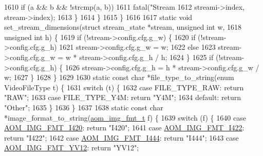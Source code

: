 \begin{DoxyCodeInclude}
{{{{{{{{{{{{{{{{{{{{{{{{1610       \textcolor{keywordflow}{if} (a && b && !strcmp(a, b))
1611         fatal(\textcolor{stringliteral}{"Stream %
1612               streami->index, stream->index);
1613     \}
1614   \}
1615 \}
1616 
1617 \textcolor{keyword}{static} \textcolor{keywordtype}{void} set\_stream\_dimensions(\textcolor{keyword}{struct} stream\_state *stream, \textcolor{keywordtype}{unsigned} \textcolor{keywordtype}{int} w,
1618                                   \textcolor{keywordtype}{unsigned} \textcolor{keywordtype}{int} h) \{
1619   \textcolor{keywordflow}{if} (!stream->config.cfg.g\_w) \{
1620     \textcolor{keywordflow}{if} (!stream->config.cfg.g\_h)
1621       stream->config.cfg.g\_w = w;
1622     \textcolor{keywordflow}{else}
1623       stream->config.cfg.g\_w = w * stream->config.cfg.g\_h / h;
1624   \}
1625   \textcolor{keywordflow}{if} (!stream->config.cfg.g\_h) \{
1626     stream->config.cfg.g\_h = h * stream->config.cfg.g\_w / w;
1627   \}
1628 \}
1629 
1630 \textcolor{keyword}{static} \textcolor{keyword}{const} \textcolor{keywordtype}{char} *file\_type\_to\_string(\textcolor{keyword}{enum} VideoFileType t) \{
1631   \textcolor{keywordflow}{switch} (t) \{
1632     \textcolor{keywordflow}{case} FILE\_TYPE\_RAW: \textcolor{keywordflow}{return} \textcolor{stringliteral}{"RAW"};
1633     \textcolor{keywordflow}{case} FILE\_TYPE\_Y4M: \textcolor{keywordflow}{return} \textcolor{stringliteral}{"Y4M"};
1634     \textcolor{keywordflow}{default}: \textcolor{keywordflow}{return} \textcolor{stringliteral}{"Other"};
1635   \}
1636 \}
1637 
1638 \textcolor{keyword}{static} \textcolor{keyword}{const} \textcolor{keywordtype}{char} *image\_format\_to\_string(\hyperlink{aom__image_8h_ab71efff8c7f49380fad23b93bc2e9bfc}{aom\_img\_fmt\_t} f) \{
1639   \textcolor{keywordflow}{switch} (f) \{
1640     \textcolor{keywordflow}{case} \hyperlink{aom__image_8h_a930317c04b4bd0a660bb5e744055523cabd778a3d697463e89d12a1117f417b60}{AOM\_IMG\_FMT\_I420}: \textcolor{keywordflow}{return} \textcolor{stringliteral}{"I420"};
1641     \textcolor{keywordflow}{case} \hyperlink{aom__image_8h_a930317c04b4bd0a660bb5e744055523cab2f75281e94ebc0f0bc728ef287cd3e8}{AOM\_IMG\_FMT\_I422}: \textcolor{keywordflow}{return} \textcolor{stringliteral}{"I422"};
1642     \textcolor{keywordflow}{case} \hyperlink{aom__image_8h_a930317c04b4bd0a660bb5e744055523ca89d423506e948ab7d3b98b5750b92655}{AOM\_IMG\_FMT\_I444}: \textcolor{keywordflow}{return} \textcolor{stringliteral}{"I444"};
1643     \textcolor{keywordflow}{case} \hyperlink{aom__image_8h_a930317c04b4bd0a660bb5e744055523cad28244100a2754409f285b77a3db90a0}{AOM\_IMG\_FMT\_YV12}: \textcolor{keywordflow}{return} \textcolor{stringliteral}{"YV12"};
}}}}}}}}}}}}}}}}}}}}}}}}}
\end{DoxyCodeInclude}
